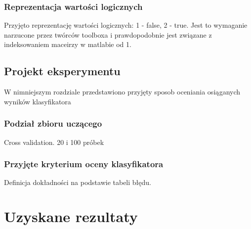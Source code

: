 \documentclass{article}
\begin{document}
\subsubsection{Reprezentacja wartości logicznych}
Przyjęto reprezentację wartości logicznych: 1 - false, 2 - true. Jest to wymaganie narzucone przez twórców toolboxa i prawdopodobnie jest związane z indeksowaniem maceirzy w matlabie od 1. 

\subsection{Projekt eksperymentu}
W nimniejszym rozdziale przedstawiono przyjęty sposob oceniania osiąganych wyników klasyfikatora

\subsubsection{Podział zbioru uczącego}
Cross validation. 20 i 100 próbek

\subsubsection{Przyjęte kryterium oceny klasyfikatora}
Definicja dokładności na podstawie tabeli błędu.

\section{Uzyskane rezultaty}
\end{document}
